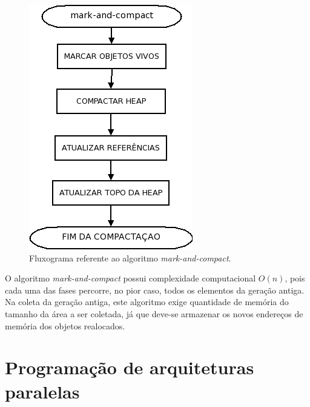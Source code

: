 \documentclass[ccc, pg2]{esinucpel}
\begin{document}
\pagebreak


%

\begin{figure}[h]
\centering
\includegraphics[width=.40\textwidth]{images/mark-and-compact_flow.png}
\caption{Fluxograma referente ao algoritmo {\it mark-and-compact}.}
\label{fig:markcompflow}
\end{figure}

O algoritmo {\it mark-and-compact} possui complexidade computacional $O(n)$, pois cada uma das fases percorre, no pior caso, todos os elementos da geração antiga. Na coleta da geração antiga, este algoritmo exige quantidade de memória do tamanho da área a ser coletada, já que deve-se armazenar os novos endereços de memória dos objetos realocados.


\chapter{Programação de arquiteturas paralelas} \label{sec:parproc}
\end{document}
